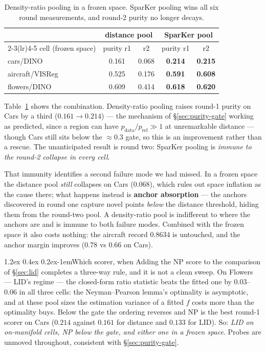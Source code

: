 \documentclass{article}
\makeatletter
\renewcommand\paragraph{\@startsection{paragraph}{4}{\z@}%
  {1.2ex \@plus 0.4ex \@minus 0.2ex}{-1em}{\normalsize\bf}}
\newcommand{\best}[1]{\textbf{#1}}
\makeatother
\begin{document}
\begin{table}[t]\centering\small
\begin{tabular}{lcccc}
\toprule
& \multicolumn{2}{c}{distance pool} & \multicolumn{2}{c}{SparKer pool}\\
\cmidrule(lr){2-3}\cmidrule(lr){4-5}
cell (frozen space) & purity r1 & r2 & purity r1 & r2 \\
\midrule
cars/DINO       & 0.161 & 0.068 & \best{0.214} & \best{0.215} \\
aircraft/VISReg & 0.525 & 0.176 & \best{0.591} & \best{0.608} \\
flowers/DINO    & 0.609 & 0.414 & \best{0.618} & \best{0.620} \\
\bottomrule
\end{tabular}
\caption{Density-ratio pooling in a frozen space. SparKer pooling wins all six
round measurements, and round-2 purity no longer decays.}
\label{tab:spkpool}
\end{table}

Table~\ref{tab:spkpool} shows the combination. Density-ratio pooling raises
round-1 purity on Cars by a third ($0.161\to0.214$) --- the mechanism of
\S\ref{sec:purity-gate} working as predicted, since a region can have
$p_{\mathrm{data}}/p_{\mathrm{ref}}\gg1$ at unremarkable distance --- though
Cars still sits below the $\approx0.3$ gate, so this is an improvement rather
than a rescue. The unanticipated result is round two: SparKer pooling is
\emph{immune to the round-2 collapse in every cell}.

That immunity identifies a second failure mode we had missed. In a frozen space
the distance pool \emph{still} collapses on Cars ($0.068$), which rules out
space inflation as the cause there; what happens instead is \textbf{anchor
absorption} --- the anchors discovered in round one capture novel points
\emph{below} the distance threshold, hiding them from the round-two pool. A
density-ratio pool is indifferent to where the anchors are and is immune to
both failure modes. Combined with the frozen space it also costs nothing: the
aircraft record $0.8634$ is untouched, and the anchor margin improves
($0.78$ vs $0.66$ on Cars).

\paragraph{Which scorer, when}
Adding the NP score to the comparison of \S\ref{sec:lid} completes a three-way
rule, and it is not a clean sweep. On Flowers --- LID's regime --- the
closed-form ratio statistic beats the fitted one by $0.03$--$0.06$ in all three
cells: the Neyman--Pearson lemma's optimality is asymptotic, and at these pool
sizes the estimation variance of a fitted $f$ costs more than the optimality
buys. Below the gate the ordering reverses and NP is the best round-1 scorer on
Cars ($0.214$ against $0.161$ for distance and $0.133$ for LID). So: \emph{LID
on on-manifold cells, NP below the gate, and either one in a frozen space}.
Probes are unmoved throughout, consistent with \S\ref{sec:purity-gate}.
\end{document}
